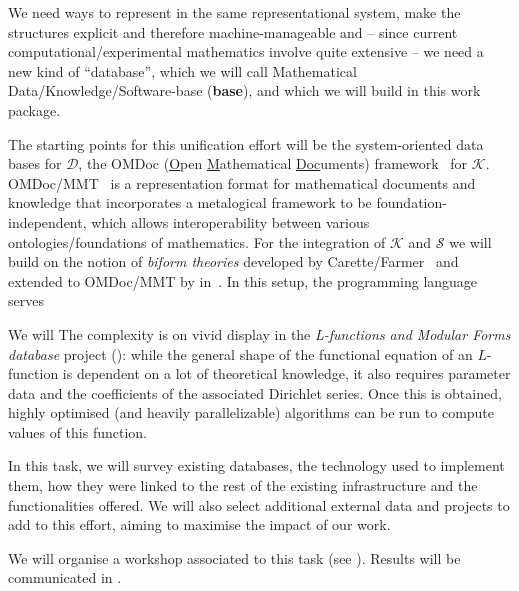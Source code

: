 \begin{workpackage}[id=dksbases,%
  title=Data/Knowledge/Software-Bases,lead=JU,
  ZHRM=12,JURM=46,UWRM=25,SARM=10,LLRM=2,PSRM=4]
\begin{wpdescription}
  We need ways to represent \DKS in the same representational system, make the \DKS
  structures explicit and therefore machine-manageable and -- since current
  computational/experimental mathematics involve quite extensive \DKS -- we need a new
  kind of ``database'', which we will call Mathematical Data/Knowledge/Software-base
  (\textbf{\DKS base}), and which we will build in this work package.

  The starting points for this unification effort will be the system-oriented data bases
  for $\mathcal{D}$, the OMDoc (\underline{O}pen \underline{M}athematical
  \underline{Doc}uments) framework~\cite{Kohlhase:OMDoc1.2} for $\mathcal{K}$.
  OMDoc/MMT~\cite{RabKoh:WSMSML13} is a representation format for mathematical documents
  and knowledge that incorporates a metalogical framework to be foundation-independent,
  which allows interoperability between various ontologies/foundations of mathematics. For
  the integration of $\mathcal{K}$ and $\mathcal{S}$ we will build on the notion of
  \emph{biform theories} developed by Carette/Farmer~\cite{Farmer:btc07} and extended to
  OMDoc/MMT by  in~\cite{KohManRab:aumftg13}. In this setup, the programming
  language serves


 We will  The complexity is on vivid display in the \emph{L-functions and Modular Forms database}
  project (\LMFDB): while the general shape of the functional equation of an $L$-function
  is dependent on a lot of theoretical knowledge, it also requires parameter data and the
  coefficients of the associated Dirichlet series. Once this is obtained, highly optimised
  (and heavily parallelizable) algorithms can be run to compute values of this function.
\end{wpdescription}

\begin{tasklist}
\begin{task}[title={Survey of existing \DKS bases, Formulation of requirements},
  id=data-assessment,lead=ZH,partners={JU,SA,UW,US},wphases=0-3,PM=4]
  In this task, we will survey existing databases, the technology used to implement them,
  how they were linked to the rest of the existing infrastructure and the functionalities
  offered. We will also select additional external data and projects to add to this
  effort, aiming to maximise the impact of our work.

  We will organise a workshop associated to this task (see
  ). Results will be communicated in
  .
\end{task}


\end{tasklist}
\end{workpackage}
